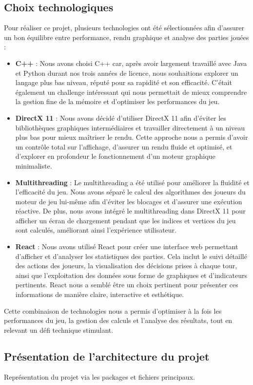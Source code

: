 \subsection{Choix technologiques}
Pour réaliser ce projet, plusieurs technologies ont été sélectionnées afin d’assurer un bon équilibre entre performance, rendu graphique et analyse des parties jouées :
\begin{itemize}
    \item \textbf{C++}  : Nous avons choisi C++ car, après avoir largement travaillé avec Java et Python durant nos trois années de licence, nous souhaitions explorer un langage plus bas niveau, réputé pour sa rapidité et son efficacité. C’était également un challenge intéressant qui nous permettait de mieux comprendre la gestion fine de la mémoire et d’optimiser les performances du jeu.
    \item \textbf{DirectX 11} : Nous avons décidé d’utiliser DirectX 11 afin d’éviter les bibliothèques graphiques intermédiaires et travailler directement à un niveau plus bas pour mieux maîtriser le rendu. Cette approche nous a permis d’avoir un contrôle total sur l’affichage, d’assurer un rendu fluide et optimisé, et d’explorer en profondeur le fonctionnement d’un moteur graphique minimaliste.
    \item \textbf{Multithreading} : Le multithreading a été utilisé pour améliorer la fluidité et l’efficacité du jeu. Nous avons séparé le calcul des algorithmes des joueurs du moteur de jeu lui-même afin d’éviter les blocages et d’assurer une exécution réactive. De plus, nous avons intégré le multithreading dans DirectX 11 pour afficher un écran de chargement pendant que les indices et vertices du jeu sont calculés, améliorant ainsi l’expérience utilisateur.
    \item \textbf{React} : Nous avons utilisé React pour créer une interface web permettant d’afficher et d’analyser les statistiques des parties. Cela inclut le suivi détaillé des actions des joueurs, la visualisation des décisions prises à chaque tour, ainsi que l’exploitation des données sous forme de graphiques et d’indicateurs pertinents. React nous a semblé être un choix pertinent pour présenter ces informations de manière claire, interactive et esthétique.
\end{itemize}
Cette combinaison de technologies nous a permis d’optimiser à la fois les performances du jeu, la gestion des calculs et l’analyse des résultats, tout en relevant un défi technique stimulant.

\subsection{Présentation de l'architecture du projet}
Représentation du projet via les packages et fichiers principaux.

